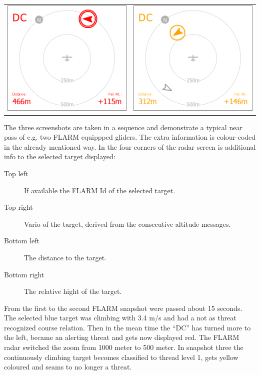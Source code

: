 \documentclass[a4paper,12pt]{refrep}
\begin{document}
\begin{center}
\begin{tabular}{c c}
\includegraphics[angle=0,width=0.5\linewidth,keepaspectratio='true']{figures/cut-flarm2.png}&
\includegraphics[angle=0,width=0.5\linewidth,keepaspectratio='true']{figures/cut-flarm3.png}\\
\end{tabular}
\end{center}
The three screenshots are taken in a sequence and demonstrate a typical near
pass of e.g. two FLARM equippped gliders. The extra information is colour-coded
in the already mentioned way. In the four corners of the radar screen is
additional info to the selected target displayed:

\begin{description}
\item[Top left]  If available the FLARM Id of the selected target. 
\item[Top right]  Vario of the target, derived from the consecutive altitude
messages.
\item[Bottom left]  The distance to the target.
\item[Bottom right]  The relative hight of the target. 
\end{description}

From the first to the second FLARM snapshot were passed about 15 seconds. The
selected blue target was climbing with 3.4 m/s and had a not as threat
recognized course relation.  Then in the mean time the ``DC'' has turned more to
the left, became an alerting threat and gets now displayed red.  The FLARM
radar switched the zoom from 1000 meter to 500 meter. In snapshot three the
continuously climbing target becomes classified to thread level 1, gets yellow 
coloured and seams to no longer a threat.  
\end{document}

